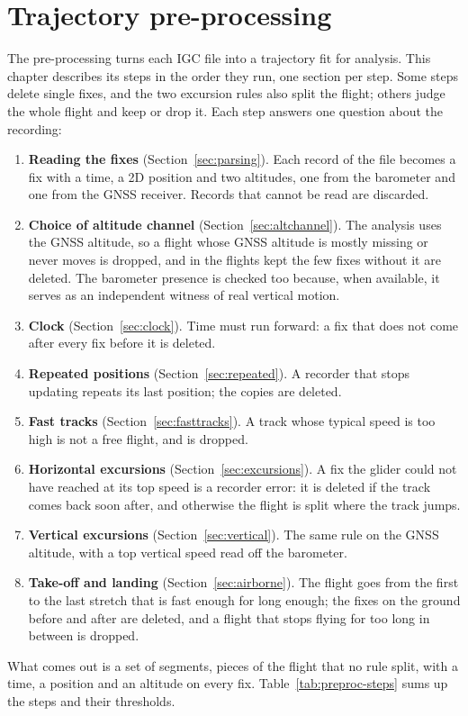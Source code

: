 \chapter{Trajectory pre-processing}
\label{ch:preproc}

The pre-processing turns each IGC file into a trajectory fit for analysis. This
chapter describes its steps in the order they run, one section per step. Some steps
delete single fixes, and the two excursion rules also split the flight; others judge the
whole flight and keep or drop it. Each step answers one question about the recording:
\begin{enumerate}
\item \textbf{Reading the fixes} (Section~\ref{sec:parsing}). Each record of the file
  becomes a fix with a time, a 2D position and two altitudes, one from the barometer and
  one from the GNSS receiver. Records that cannot be read are discarded.
\item \textbf{Choice of altitude channel} (Section~\ref{sec:altchannel}). The analysis
  uses the GNSS altitude, so a flight whose GNSS altitude is mostly missing or never
  moves is dropped, and in the flights kept the few fixes without it are deleted. The
  barometer presence is checked too because, when available, it serves as an independent
  witness of real vertical motion.
\item \textbf{Clock} (Section~\ref{sec:clock}). Time must run forward: a fix that does
  not come after every fix before it is deleted.
\item \textbf{Repeated positions} (Section~\ref{sec:repeated}). A recorder that stops
  updating repeats its last position; the copies are deleted.
\item \textbf{Fast tracks} (Section~\ref{sec:fasttracks}). A track whose typical speed is
  too high is not a free flight, and is dropped.
\item \textbf{Horizontal excursions} (Section~\ref{sec:excursions}). A fix the glider
  could not have reached at its top speed is a recorder error: it is deleted if the track
  comes back soon after, and otherwise the flight is split where the track jumps.
\item \textbf{Vertical excursions} (Section~\ref{sec:vertical}). The same rule on the
  GNSS altitude, with a top vertical speed read off the barometer.
\item \textbf{Take-off and landing} (Section~\ref{sec:airborne}). The flight goes from
  the first to the last stretch that is fast enough for long enough; the fixes on the
  ground before and after are deleted, and a flight that stops flying for too long in
  between is dropped.
\end{enumerate}
What comes out is a set of segments, pieces of the flight that no rule split, with a
time, a position and an altitude on every fix. Table~\ref{tab:preproc-steps} sums up the
steps and their thresholds.

